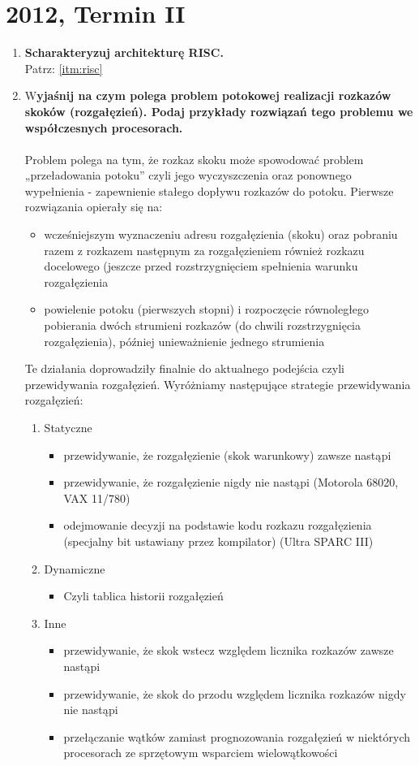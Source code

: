 	\section{2012, Termin II}
		\begin{enumerate}
			\item \textbf{Scharakteryzuj architekturę RISC.}\\
			Patrz: \ref{itm:risc}
			\item W\textbf{yjaśnij na czym polega problem potokowej realizacji rozkazów skoków (rozgałęzień). Podaj przykłady rozwiązań tego problemu we współczesnych procesorach.}\\\\
			Problem polega na tym, że rozkaz skoku może spowodować problem „przeładowania potoku” czyli jego wyczyszczenia oraz ponownego wypełnienia - zapewnienie stałego dopływu rozkazów do potoku. Pierwsze rozwiązania opierały się na:
			\begin{itemize}
				\item wcześniejszym wyznaczeniu adresu rozgałęzienia (skoku) oraz pobraniu razem z rozkazem następnym za rozgałęzieniem również rozkazu docelowego (jeszcze przed rozstrzygnięciem spełnienia warunku rozgałęzienia
				\item powielenie potoku (pierwszych stopni) i rozpoczęcie równoległego pobierania dwóch strumieni rozkazów (do chwili rozstrzygnięcia rozgałęzienia), później unieważnienie jednego strumienia
			\end{itemize}
			Te działania doprowadziły finalnie do aktualnego podejścia czyli przewidywania rozgałęzień. Wyróżniamy następujące strategie przewidywania rozgałęzień:
			\begin{enumerate}
				\item Statyczne
				\begin{itemize}
					\item przewidywanie, że rozgałęzienie (skok warunkowy) zawsze nastąpi
					\item przewidywanie, że rozgałęzienie nigdy nie nastąpi (Motorola 68020, VAX 11/780)
					\item odejmowanie decyzji na podstawie kodu rozkazu rozgałęzienia (specjalny bit ustawiany przez kompilator) (Ultra SPARC III)
				\end{itemize}
				\item Dynamiczne
				\begin{itemize}
					\item Czyli tablica historii rozgałęzień
				\end{itemize}
				\item Inne
				\begin{itemize}
					\item przewidywanie, że skok wstecz względem licznika rozkazów zawsze nastąpi
					\item przewidywanie, że skok do przodu względem licznika rozkazów nigdy nie nastąpi
					\item przełączanie wątków zamiast prognozowania rozgałęzień w niektórych procesorach ze sprzętowym wsparciem wielowątkowości
				\end{itemize}
			\end{enumerate}
			

\end{enumerate}
